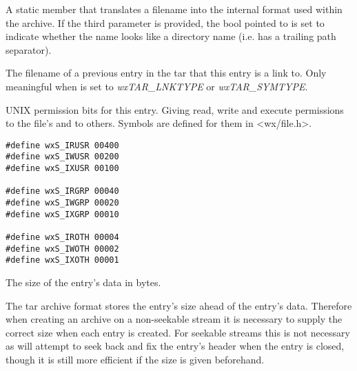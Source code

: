 A static member that translates a filename into the internal format used
within the archive. If the third parameter is provided, the bool pointed
to is set to indicate whether the name looks like a directory name
(i.e. has a trailing path separator).


\label{wxtarentrylinkname}



The filename of a previous entry in the tar that this entry is a link to.
Only meaningful when  is set
to {\it wxTAR\_LNKTYPE} or {\it wxTAR\_SYMTYPE}.


\label{wxtarentrymode}



UNIX permission bits for this entry. Giving read, write and execute permissions
to the file's  and to others.
Symbols are defined for them in <wx/file.h>.

\begin{verbatim}
#define wxS_IRUSR 00400
#define wxS_IWUSR 00200
#define wxS_IXUSR 00100

#define wxS_IRGRP 00040
#define wxS_IWGRP 00020
#define wxS_IXGRP 00010

#define wxS_IROTH 00004
#define wxS_IWOTH 00002
#define wxS_IXOTH 00001

\end{verbatim}


\label{wxtarentrysize}



The size of the entry's data in bytes.

The tar archive format stores the entry's size ahead of the entry's data.
Therefore when creating an archive on a non-seekable stream it is necessary to
supply the correct size when each entry is created. For seekable streams this
is not necessary as  will attempt
to seek back and fix the entry's header when the entry is closed, though it is
still more efficient if the size is given beforehand.


